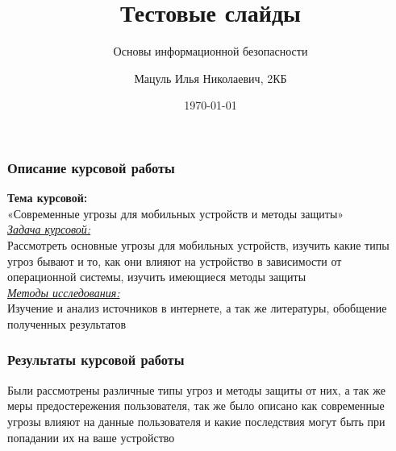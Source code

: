 \documentclass{beamer}
\title{Тестовые слайды}
\subtitle{Основы информационной безопасности}
\author{Мацуль Илья Николаевич, 2КБ}
\date{\today}
\institute{БФУ им. И.Канта}
\begin{document}
\begin{frame}
\titlepage
\end{frame}

\begin{frame}
\frametitle{Описание курсовой работы}
	\begin{center}
		
\textbf{Тема курсовой:}\\
«Современные угрозы для мобильных устройств и методы защиты»\\

\underline{\textit{Задача курсовой:}}\\
Рассмотреть основные угрозы для мобильных устройств, изучить какие типы угроз бывают и то, как они влияют на устройство в зависимости от операционной системы, изучить имеющиеся методы защиты\\

\underline{\textit{Методы исследования:}}\\
Изучение и анализ источников в интернете, а так же литературы, обобщение полученных результатов

	\end{center}
\end{frame}

\begin{frame}
\frametitle{Результаты курсовой работы}
Были рассмотрены различные типы угроз и методы защиты от них, а так же меры предостережения пользователя, так же было описано как современные угрозы влияют на данные пользователя и какие последствия могут быть при попадании их на ваше устройство
\end{frame}
\end{document}
